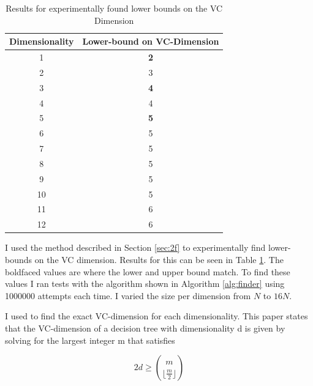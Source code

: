 \documentclass[11pt,a4paper]{article}
\begin{document}
\begin{table}
    \centering
    \begin{tabular}{|c|c|}
    \hline
    Dimensionality & Lower-bound on VC-Dimension \\ \hline
    1              & \textbf{2}                            \\ \hline
    2              & 3                            \\ \hline
    3              & \textbf{4}                            \\ \hline
    4              & 4                            \\ \hline
    5              & \textbf{5}                            \\ \hline
    6              &    5                         \\ \hline
    7              & 5                           \\ \hline
    8              & 5                            \\ \hline
    9              & 5                            \\ \hline
    10              & 5                            \\ \hline
    11             &  6                          \\ \hline
    12              &  6                           \\ \hline
    \end{tabular}
    \caption{Results for experimentally found lower bounds on the VC Dimension}
    \label{tab:experiment-lower-bound-vc}
\end{table}

I used the method described in Section \ref{sec:2f} to experimentally find lower-bounds on the VC dimension. Results for this can be seen in Table \ref{tab:experiment-lower-bound-vc}. The boldfaced values are where the lower and upper bound match. To find these values I ran tests with the algorithm shown in Algorithm \ref{alg:finder} using 1000000 attempts each time. I varied the size per dimension from $N$ to $16N$.

I used \cite{decicion-stump-vc-dimension} to find the exact VC-dimension for each dimensionality. This paper states that the VC-dimension of a decision tree with dimensionality d is given by solving for the largest integer m that satisfies

\[ 2d \geq {m \choose \lfloor\frac{m}{2}\rfloor} \]
\end{document}
